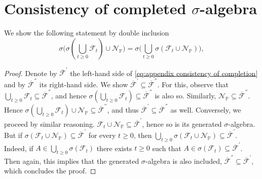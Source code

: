 \documentclass[11pt,a4paper,twoside,openany]{report}
\numberwithin{equation}{section}
\theoremstyle{plain} %
\theoremstyle{definition} %
\theoremstyle{remark} %
\begin{document}
\section{Consistency of completed \(\sigma\)-algebra}\label{Appendix:Consistency of completed sigma-algebra}
We show the following statement by double inclusion
\begin{equation}\label{eq:appendix consistency of completion}
    \sigma\Big(\sigma(\bigcup_{t\geq 0}\mathcal{F}_t)\cup\mathcal{N}_{\mathbb{P}}\Big)=\sigma\Big(\bigcup_{t\geq 0}\sigma(\mathcal{F}_t\cup\mathcal{N}_{\mathbb{P}})\Big),
\end{equation}
\begin{proof}
Denote by \(\overline{\mathcal{F}}^{'}\) the left-hand side of \eqref{eq:appendix consistency of completion} and by \(\overline{\mathcal{F}}^{''}\) its right-hand side. We show \(\overline{\mathcal{F}}^{'}\subseteq \overline{\mathcal{F}}^{''}\). For this, observe that \(\bigcup_{t\geq 0}\mathcal{F}_t\subseteq \overline{\mathcal{F}}^{''}\), and hence \(\sigma(\bigcup_{t\geq 0}\mathcal{F}_t)\subseteq \overline{\mathcal{F}}^{''}\) is also so. Similarly, \(\mathcal{N}_{\mathbb{P}}\subseteq\overline{\mathcal{F}}^{''} \). Hence \(\sigma(\bigcup_{t\geq 0}\mathcal{F}_t)\cup \mathcal{N}_{\mathbb{P}}\subseteq \overline{\mathcal{F}}^{''}\), and thus \(\overline{\mathcal{F}}^{'}\subseteq \overline{\mathcal{F}}^{''}\) as well. Conversely, we proceed by similar reasoning. \(\mathcal{F}_t\cup\mathcal{N}_{\mathbb{P}}\subseteq \overline{\mathcal{F}}^{'}\), hence so is its generated \(\sigma\)-algebra. But if \(\sigma(\mathcal{F}_t\cup\mathcal{N}_{\mathbb{P}})\subseteq\overline{\mathcal{F}}^{'}\) for every \(t\geq 0\), then \(\bigcup_{t\geq 0}\sigma(\mathcal{F}_t\cup\mathcal{N}_{\mathbb{P}})\subseteq\overline{\mathcal{F}}^{'}\). Indeed, if \(A\in \bigcup_{t\geq 0}\sigma(\mathcal{F}_t)\) there exists \(t\geq 0\) such that \(A\in \sigma(\mathcal{F}_t)\subseteq\overline{\mathcal{F}}^{'}\). Then again, this implies that the generated \(\sigma\)-algebra is also included, \(\overline{\mathcal{F}}^{''}\subseteq \overline{\mathcal{F}}^{'}\), which concludes the proof. 
\end{proof}
\end{document}
